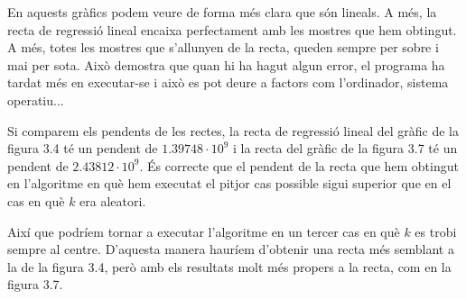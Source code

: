 En aquests gràfics podem veure de forma més clara que són lineals. A més, la recta de regressió lineal encaixa perfectament amb les mostres que hem obtingut. A més, totes les mostres que s'allunyen de la recta, queden sempre per sobre i mai per sota. Això demostra que quan hi ha hagut algun error, el programa ha tardat més en executar-se i això es pot deure a factors com l'ordinador, sistema operatiu... 

Si comparem els pendents de les rectes, la recta de regressió lineal del gràfic de la figura 3.4 té un pendent de $1.39748 \cdot 10^9$ i la recta del gràfic de la figura 3.7 té un pendent de $2.43812 \cdot 10^9$. És correcte que el pendent de la recta que hem obtingut en l'algoritme en què hem executat el pitjor cas possible sigui superior que en el cas en què $k$ era aleatori. 

Així que podríem tornar a executar l'algoritme en un tercer cas en què $k$ es trobi sempre al centre. D'aquesta manera hauríem d'obtenir una recta més semblant a la de la figura 3.4, però amb els resultats molt més propers a la recta, com en la figura 3.7.


